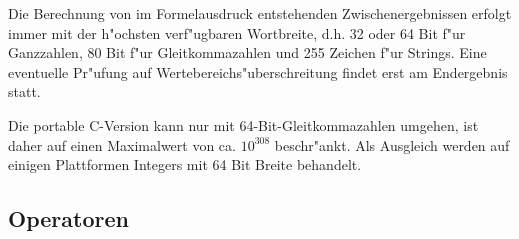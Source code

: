 \documentclass[12pt,a4paper,twoside]{report}
\begin{document}
Die Berechnung von im Formelausdruck entstehenden Zwischenergebnissen
erfolgt immer mit der h"ochsten verf"ugbaren Wortbreite, d.h. 32 oder 64 Bit
f"ur Ganzzahlen, 80 Bit f"ur Gleitkommazahlen und 255 Zeichen f"ur Strings.
Eine eventuelle Pr"ufung auf Wertebereichs"uberschreitung findet erst am
Endergebnis statt.
\par
Die portable C-Version  kann nur mit
64-Bit-Gleitkommazahlen umgehen, ist daher auf einen Maximalwert von ca.
$10^{308}$ beschr"ankt.  Als Ausgleich werden auf einigen Plattformen
Integers mit 64 Bit Breite behandelt.

\subsection{Operatoren}
\end{document}
